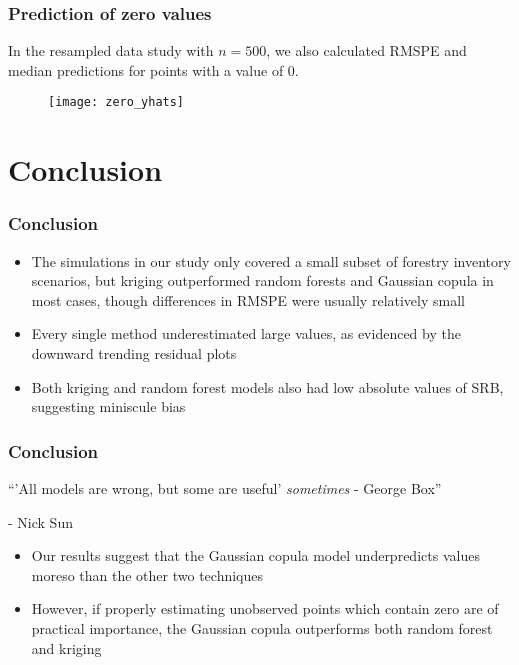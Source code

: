 \documentclass{beamer}
\begin{document}
\begin{frame}
	\frametitle{Prediction of zero values}
	In the resampled data study with $n = 500$, we also calculated RMSPE and median predictions for points with a value of 0.
	\begin{figure}[h]
		\centering
	\texttt{[image: zero\_yhats]}
	\end{figure}
	\begin{center}
	\end{center}
\end{frame}

\section{Conclusion}
\begin{frame}
	\frametitle{Conclusion}
	\begin{itemize}
	\item The simulations in our study only covered a small subset of forestry inventory scenarios, but kriging outperformed random forests and Gaussian copula in most cases, though differences in RMSPE were usually relatively small
	\item Every single method underestimated large values, as evidenced by the downward trending residual plots
	\item Both kriging and random forest models also had low absolute values of SRB, suggesting miniscule bias
	\end{itemize}
\end{frame}

\begin{frame}
	\frametitle{Conclusion}
	``'All models are wrong, but some are useful' \textit{sometimes} - George Box''
	
	- Nick Sun

	\begin{itemize}
	\item Our results suggest that the Gaussian copula model underpredicts values moreso than the other two techniques
	\item However, if properly estimating unobserved points which contain zero are of practical importance, the Gaussian copula outperforms both random forest and kriging
	\end{itemize}
\end{frame}
\end{document}
